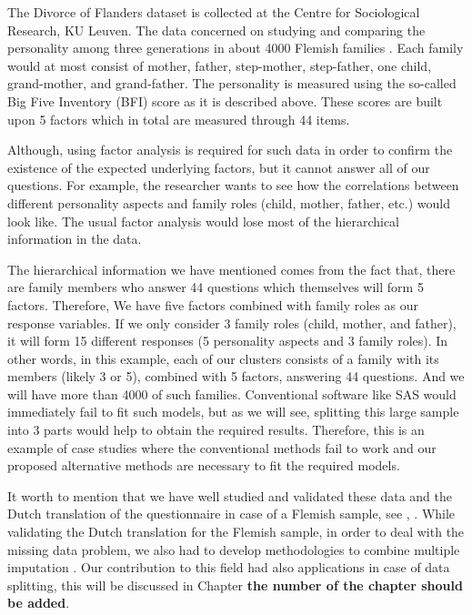 \documentclass[11pt,a5paper,twoside]{book}
\begin{document}
The Divorce of Flanders dataset is collected at the Centre for Sociological Research, KU Leuven. The data concerned on studying and comparing the personality among
three generations in about 4000 Flemish families \citep{mortelmans2011}. Each family would at most consist of mother, father, step-mother, step-father, one child, grand-mother, and grand-father.  The personality is measured using the so-called Big Five Inventory (BFI) score as it is described above. These scores are built upon 5 factors which in total are measured through 44 items. 

Although, using factor analysis is required for such data in order to confirm the existence of the expected underlying factors, but it cannot answer all of our questions. For example, the researcher wants to see how the correlations between different personality aspects and family roles (child, mother, father, etc.) would look like. The usual factor analysis would lose most of the hierarchical information in the data. 

The hierarchical information we have mentioned comes from the fact that, there are family members who answer 44 questions which themselves will form 5 factors. Therefore, We have five factors combined with family roles as our response variables. If we only consider 3 family roles (child, mother, and father), it will form 15 different responses (5 personality aspects and 3 family roles). In other words, in this example, each of our clusters consists of a family with its members (likely 3 or 5), combined with 5 factors, answering 44 questions. And we will have more than 4000 of such families. Conventional software like SAS would immediately fail to fit such models, but as we will see, splitting this large sample into 3 parts would help to obtain the required results. Therefore, this is an example of case studies where the conventional methods fail to work and our proposed alternative methods are necessary to fit the required models.

It worth to mention that we have well studied and validated these data and the Dutch translation of the questionnaire in case of a Flemish sample, see \cite{lovik2017a}, \cite{lovik2017b}. While validating the Dutch translation for the Flemish sample, in order to deal with the missing data problem, we also had to develop methodologies to combine multiple imputation \citep{rubin1987, carpenter2012}. Our contribution to this field had also applications in case of data splitting, this will be discussed in Chapter \textbf{the number of the chapter should be added}.
\end{document}
